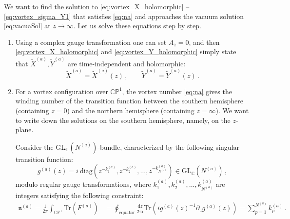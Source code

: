\documentclass[12pt,a4paper]{article}
\newcommand{\nn}{\mathfrak{n}}
\renewcommand{\(}{\left(}
\renewcommand{\)}{\right)}
\renewcommand{\(}{\left(}
\renewcommand{\)}{\right)}
\begin{document}
\medskip

We want to find the solution to 
\eqref{eq:vortex_X_holomorphic} -- \eqref{eq:vortex_sigma_Y1} that satisfies \eqref{eq:na} and approaches the vacuum solution \eqref{eq:vacuaSol} at $z\rightarrow \infty$.
Let us solve these equations step by step.
\begin{enumerate}
\item Using a complex gauge transformation one can set $A_{\bar{z}}=0$, and then \eqref{eq:vortex_X_holomorphic} and \eqref{eq:vortex_Y_holomorphic} simply state that $\tilde{X}^{(a)},\tilde{Y}^{(a)}$ are time-independent and holomorphic:
\begin{equation}\label{eq:XYholo}
\tilde{X}^{(a)}=\tilde{X}^{(a)}(z)\,,\qquad \tilde{Y}^{(a)}=\tilde{Y}^{(a)}(z)\,. 
\end{equation}
\item For a vortex configuration over $\mathbb{CP}^1$, the vortex number \eqref{eq:na} gives the winding number of the transition function between the southern hemisphere (containing $z=0$) and the northern hemisphere (containing $z=\infty$). 
We want to write down the solutions on the southern hemisphere, namely, on the $z$-plane. 

Consider the GL$_{\mathbb{C}}(N^{(a)})$-bundle, characterized by the following singular transition function:
\begin{equation}\label{eq:transition}
g^{(a)}(z)=i \ \text{diag}(z^{-k^{(a)}_1},{z^{-k^{(a)}_2}},\dots,{z^{-k^{(a)}_{N^{(a)}}}})\in \text{GL}_{\mathbb{C}}(N^{(a)})\,,
\end{equation}
modulo regular gauge transformations, where $k^{(a)}_1,k^{(a)}_2,\dots,k^{(a)}_{N^{(a)}}$ are integers satisfying the following constraint: 
\begin{equation}
\begin{aligned}
\nn^{(a)}=\frac{1}{2\pi}\int_{\mathbb{CP}^1}\mathrm{Tr}(F^{(a)})&=\oint_{\textrm{equator}}\frac{\mathrm{d}z}{2\pi \textrm{i}}\mathrm{Tr}\left(ig^{(a)}(z)^{-1}\partial_zg^{(a)}(z)\right)
=\sum_{p=1}^{N^{(a)}}k^{(a)}_p\,.
\end{aligned}
\end{equation}



\end{enumerate}
\end{document}
